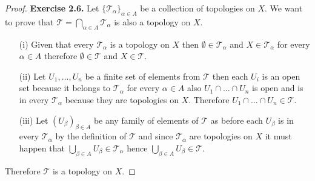 \documentclass[11pt]{article}
\newcommand{\Topo}{\mathcal{T}}
\theoremstyle{definition}
\begin{document}
\cleardoublepage
\begin{proof}{\textbf{Exercise 2.6.}}
    Let $\{\Topo_\alpha\}_{\alpha \in A}$ be a collection of topologies on $X$.
    We want to prove that $\Topo = \bigcap_{\alpha \in A} \Topo_\alpha$ is also
    a topology on $X$.
    \begin{itemize}
    \item [(i)] Given that every $\Topo_\alpha$ is a topology on $X$ then
    $\emptyset \in \Topo_\alpha$ and $X \in \Topo_\alpha$ for every
    $\alpha \in A$ therefore $\emptyset \in \Topo$ and $X \in \Topo$.
    \item [(ii)] Let $U_1, ..., U_n$ be a finite set of elements from $\Topo$
    then each $U_i$ is an open set because it belongs to $\Topo_\alpha$
    for every $\alpha \in A$
    also $U_1 \cap ... \cap U_n$ is open and is in every $\Topo_\alpha$ because
    they are topologies on $X$. Therefore $U_1 \cap ... \cap U_n \in \Topo$.    
    \item [(iii)] Let $(U_{\beta})_{\beta \in A}$ be any family of elements
    of $\Topo$ as before each $U_\beta$ is in every $\Topo_\alpha$ by the
    definition of $\Topo$ and since $\Topo_\alpha$ are topologies on $X$
    it must happen that $\bigcup_{\beta \in A} U_\beta \in \Topo_\alpha$
    hence $\bigcup_{\beta \in A} U_\beta \in \Topo$. 
    \end{itemize}
    Therefore $\Topo$ is a topology on $X$.
\end{proof}
\end{document}
